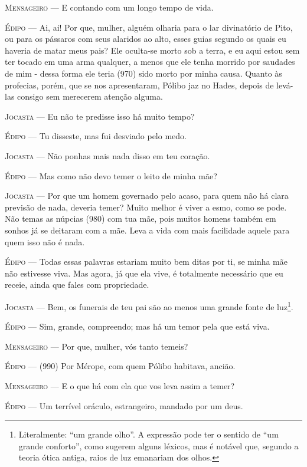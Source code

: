 \textsc{Mensageiro} --- E contando com um longo tempo de vida.

\textsc{Édipo} --- Ai, ai! Por que, mulher, alguém olharia para o lar divinatório de Pito,
ou para os pássaros com seus alaridos ao alto, esses guias segundo os
quais eu haveria de matar meus pais? Ele oculta-se morto sob a terra, e
eu aqui estou sem ter tocado em uma arma qualquer, a menos que ele tenha
morrido por saudades de mim - dessa forma ele teria (970) sido morto por
minha causa. Quanto às profecias, porém, que se nos apresentaram, Pólibo
jaz no Hades, depois de levá-las consigo sem merecerem atenção alguma.

\textsc{Jocasta} --- Eu não te predisse isso há muito tempo?

\textsc{Édipo} --- Tu disseste, mas fui desviado pelo medo.

\textsc{Jocasta} --- Não ponhas mais nada disso em teu coração.

\textsc{Édipo} --- Mas como não devo temer o leito de minha mãe?

\textsc{Jocasta} --- Por que um homem governado pelo acaso, para quem não há clara previsão
de nada, deveria temer? Muito melhor é viver a esmo, como se pode. Não
temas as núpcias (980) com tua mãe, pois muitos homens também em sonhos
já se deitaram com a mãe. Leva a vida com mais facilidade aquele para
quem isso não é nada.

\textsc{Édipo} --- Todas essas palavras estariam muito bem ditas por ti, se minha mãe não
estivesse viva. Mas agora, já que ela vive, é totalmente necessário que
eu receie, ainda que fales com propriedade.

\textsc{Jocasta} --- Bem, os funerais de teu pai são ao menos uma grande fonte de
luz\footnote{Literalmente: ``um grande olho''. A expressão pode ter o
  sentido de ``um grande conforto'', como sugerem alguns léxicos, mas é
  notável que, segundo a teoria ótica antiga, raios de luz emanariam dos
  olhos.}.

\textsc{Édipo} --- Sim, grande, compreendo; mas há um temor pela que está viva.

\textsc{Mensageiro} --- Por que, mulher, vós tanto temeis?

\textsc{Édipo} --- (990) Por Mérope, com quem Pólibo habitava, ancião.

\textsc{Mensageiro} --- E o que há com ela que vos leva assim a temer?

\textsc{Édipo} --- Um terrível oráculo, estrangeiro, mandado por um deus.

